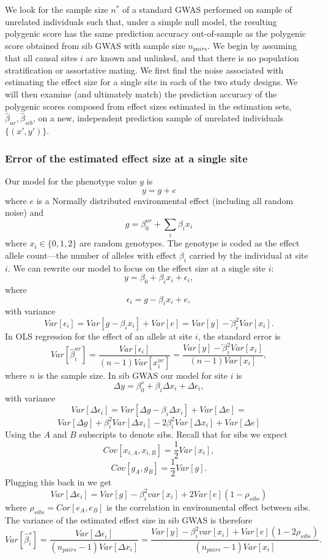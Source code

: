 \documentclass[hidelinks, 12pt]{article}
\begin{document}
We look for the sample size $n^*$ of a standard GWAS performed on sample of unrelated individuals such that, under a simple null model, the resulting polygenic score has the same prediction accuracy out-of-sample as the polygenic score obtained from sib GWAS with sample size $n_{pairs}$.  We begin by assuming that all causal sites $i$ are known and unlinked, and that there is no population stratification or assortative mating.  We  first find the noise associated with estimating the effect size for a single site in each of the two study designs.  We will then examine (and ultimately match) the prediction accuracy of the polygenic scores composed from effect sizes estimated in the estimation sets, $\hat{\beta}_{ur},\hat{\beta}_{sib}$, on a new, independent prediction sample of unrelated individuals $\{(x',y')\}$.

\subsubsection{Error of the estimated effect size at a single site}
Our model for the phenotype value $y$ is
$$y=g+e$$
where $e$ is a Normally distributed environmental effect (including all random noise) and
$$g=\beta^{ur}_0+\sum_{i}\beta_ix_i$$ 
where $x_i \in \{0,1,2\}$ are random genotypes.  The genotype is coded as the effect allele count---the number of alleles with effect $\beta_i$ carried by the individual at site $i$.  We can rewrite our model to focus on the effect size at a single site $i$:
\begin{equation}
\label{ols_model}
y=\beta_0+\beta_ix_i+\epsilon_i,
\end{equation}
where 
$$\epsilon_i=g-\beta_i x_i+e,$$
with variance
$$Var[\epsilon_i]=Var[g-\beta_i x_i]+Var[e] = Var[y]-ֿ\beta_i^2Var[x_i].$$
In OLS regression for the effect of an allele at site $i$, the standard error is
$$Var[\hat{\beta}^{ur}_i]=\frac{Var[\epsilon_i]}{(n-1) Var[x_i^{ur}]} = \frac{Var[y]-ֿ\beta_i^2Var[x_i]}{(n-1)Var[x_i]},$$
where $n$ is the sample size.  In sib GWAS our model for site $i$ is
$$\Delta y=\beta^{s}_0+\beta_i \Delta x_i+\Delta \epsilon_i,$$
with variance
$$Var[\Delta \epsilon_i] = Var[\Delta g-\beta_i \Delta x_i] + Var[\Delta e] =$$
$$Var[\Delta g]+\beta_i^2Var[\Delta x_i]-2\beta_i^2 Var[\Delta x_i]+ Var[\Delta e]$$
Using the $A$ and $B$ subscripts to denote sibs. Recall that for sibs we expect
$$Cov[x_{i,A},x_{i,B}]=\frac{1}{2}Var[x_i],$$
$$Cov[g_A,g_B]=\frac{1}{2}Var[g].$$
Plugging this back in we get
$$Var[\Delta \epsilon_i] = Var[g] - \beta_i^2var[x_i] + 2Var[e](1-\rho_{sibs}) $$
where $\rho_{sibs} = Cor[e_A,e_B]$ is the correlation in environmental effect between sibs. The variance of the estimated effect size in sib GWAS is therefore
$$Var[\hat{\beta}^{s}_i]=\frac{Var[\Delta \epsilon_i]}{(n_{pairs}-1) Var[\Delta x_i]} = \frac{Var[y] - \beta_i^2var[x_i] + Var[e](1-2\rho_{sibs})}{(n_{pairs}-1) Var[x_i]}.$$
\end{document}
